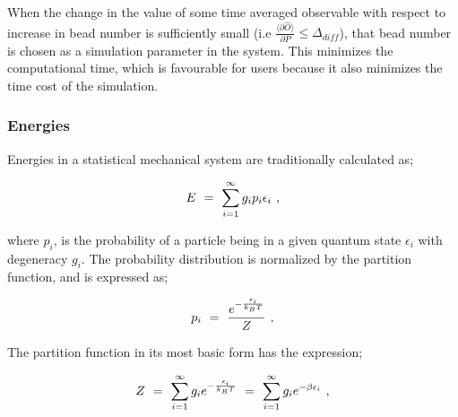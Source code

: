\documentclass{ece}
\begin{document}
When the change in the value of some time averaged observable with respect to increase in bead number is sufficiently small (i.e \begin{math} \frac{\langle \partial{\hat{O}} \rangle}{\partial{P}} \leq \Delta_{diff} \end{math}), that bead number is chosen as a simulation parameter in the system. This minimizes the computational time, which is favourable for users because it also minimizes the time cost of the simulation.

\subsubsection{Energies}

Energies in a statistical mechanical system are traditionally calculated as;

\begin{equation} \label{eq:30}
E \hspace{0.125cm} = \hspace{0.125cm} \sum_{i = 1}^{\infty} g_i p_i \epsilon_{i} \hspace{0.125cm} ,
\end{equation}

where \begin{math} p_i \end{math}, is the probability of a particle being in a given quantum state \begin{math} \epsilon_{i} \end{math} with degeneracy \begin{math} g_{i} \end{math}. The probability distribution is normalized by the partition function, and is expressed as;

\begin{equation} \label{eq:31}
p_i \hspace{0.125cm} = \hspace{0.125cm} \frac{ e^{-\frac{ \epsilon_i}{k_B T}}}{Z}  \hspace{0.125cm} ,
\end{equation}

The partition function in its most basic form has the expression;

\begin{equation} \label{eq:32}
Z \hspace{0.125cm} = \hspace{0.125cm} \sum_{i = 1}^{\infty} g_i e^{-\frac{ \epsilon_i}{k_B T}} \hspace{0.125cm} = \hspace{0.125cm} \sum_{i = 1}^{\infty} g_i e^{- \beta \epsilon_i} \hspace{0.125cm} ,
\end{equation}
\end{document}
